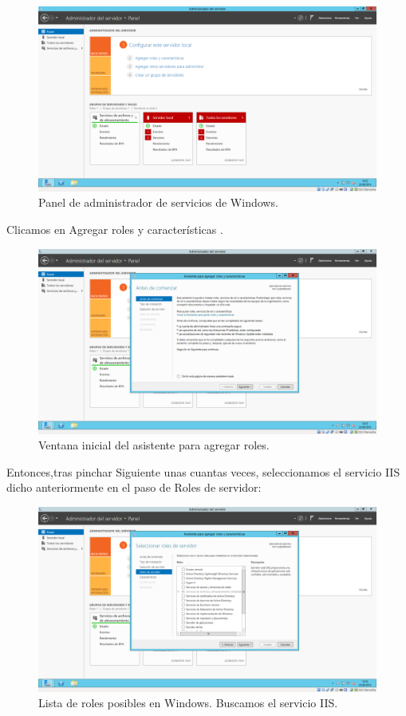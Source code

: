 \begin{itemize}
	\begin{figure}[H]
		\centering
		\includegraphics[width=0.7\linewidth]{WSAdministradorPanel}
		\caption[AdministradorPanel]{Panel de administrador de servicios de Windows.}
		\label{fig:WSAdministradorPanel}
	\end{figure}

	Clicamos en Agregar roles y características .\\
		
	\begin{figure}[H]
		\centering
		\includegraphics[width=0.7\linewidth]{AgregarRoles}
		\caption[Agregar roles]{Ventana inicial del asistente para agregar roles.}
		\label{fig:AgregarRoles}
	\end{figure}
	
	Entonces,tras pinchar Siguiente unas cuantas veces, seleccionamos el servicio IIS dicho anteriormente en el paso de Roles de servidor:\\
	
	\begin{figure}[H]
		\centering
		\includegraphics[width=0.7\linewidth]{SeleccionRoles}
		\caption[Selección de roles]{Lista de roles posibles en Windows. Buscamos el servicio IIS.}
		\label{fig:SeleccionRoles}
	\end{figure}
		

\end{itemize}

